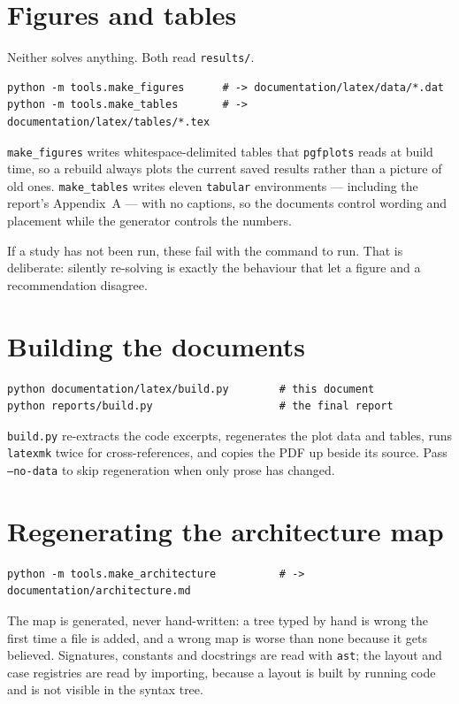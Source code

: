 \documentclass[11pt,a4paper]{report}
\newcommand{\code}[1]{\texttt{\small #1}}
\begin{document}
\section{Figures and tables}

Neither solves anything. Both read \code{results/}.

\begin{verbatim}
python -m tools.make_figures      # -> documentation/latex/data/*.dat
python -m tools.make_tables       # -> documentation/latex/tables/*.tex
\end{verbatim}

\code{make\_figures} writes whitespace-delimited tables that
\code{pgfplots} reads at build time, so a rebuild always plots the
current saved results rather than a picture of old ones.
\code{make\_tables} writes eleven \code{tabular} environments ---
including the report's Appendix~A --- with no captions, so the documents
control wording and placement while the generator controls the numbers.

If a study has not been run, these fail with the command to run. That is
deliberate: silently re-solving is exactly the behaviour that let a
figure and a recommendation disagree.

\section{Building the documents}

\begin{verbatim}
python documentation/latex/build.py        # this document
python reports/build.py                    # the final report
\end{verbatim}

\code{build.py} re-extracts the code excerpts, regenerates the plot data
and tables, runs \code{latexmk} twice for cross-references, and copies
the PDF up beside its source. Pass \code{--no-data} to skip
regeneration when only prose has changed.

\section{Regenerating the architecture map}

\begin{verbatim}
python -m tools.make_architecture          # -> documentation/architecture.md
\end{verbatim}

The map is generated, never hand-written: a tree typed by hand is wrong
the first time a file is added, and a wrong map is worse than none
because it gets believed. Signatures, constants and docstrings are read
with \code{ast}; the layout and case registries are read by importing,
because a layout is built by running code and is not visible in the
syntax tree.
\end{document}
